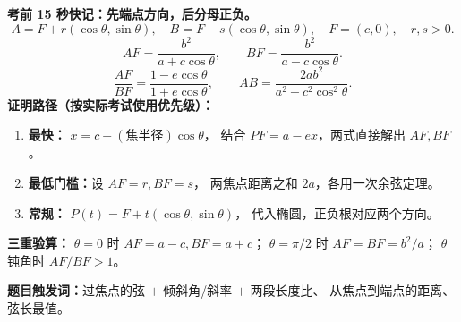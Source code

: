 \begin{summarybox}
\textbf{考前 15 秒快记：先端点方向，后分母正负。}
\[
 A=F+r(\cos\theta,\sin\theta),\quad
 B=F-s(\cos\theta,\sin\theta),\quad F=(c,0),\quad r,s>0.
\]
\[
 \boxed{AF=\frac{b^2}{a+c\cos\theta}},\qquad
 \boxed{BF=\frac{b^2}{a-c\cos\theta}}.
\]
\[
 \boxed{\frac{AF}{BF}=\frac{1-e\cos\theta}{1+e\cos\theta}},\qquad
 \boxed{AB=\frac{2ab^2}{a^2-c^2\cos^2\theta}}.
\]
\textbf{证明路径（按实际考试使用优先级）：}
\begin{enumerate}
 \item \textbf{最快：} $x=c\pm(\text{焦半径})\cos\theta$，
 结合 $PF=a-ex$，两式直接解出 $AF,BF$。
 \item \textbf{最低门槛：}设 $AF=r,BF=s$，
 两焦点距离之和 $2a$，各用一次余弦定理。
 \item \textbf{常规：} $P(t)=F+t(\cos\theta,\sin\theta)$，
 代入椭圆，正负根对应两个方向。
\end{enumerate}
\textbf{三重验算：}
$\theta=0$ 时 $AF=a-c,BF=a+c$；
$\theta=\pi/2$ 时 $AF=BF=b^2/a$；
$\theta$ 钝角时 $AF/BF>1$。
\par\smallskip\noindent
\textbf{题目触发词：}过焦点的弦 $+$ 倾斜角/斜率 $+$ 两段长度比、
从焦点到端点的距离、弦长最值。
\end{summarybox}
